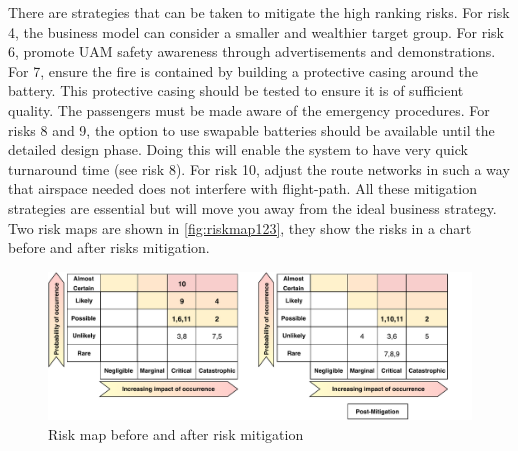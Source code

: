 There are strategies that can be taken to mitigate the high ranking risks. For risk 4, the business model can consider a smaller and wealthier target group. For risk 6, promote UAM safety awareness through advertisements and demonstrations. For 7, ensure the fire is contained by building a protective casing around the battery. This protective casing should be tested to ensure it is of sufficient quality. The passengers must be made aware of the emergency procedures. For risks 8 and 9, the option to use swapable batteries should be available until the detailed design phase. Doing this will enable the system to have very quick turnaround time (see risk 8). For risk 10, adjust the route networks in such a way that airspace needed does not interfere with flight-path. All these mitigation strategies are essential but will move you away from the ideal business strategy. Two risk maps are shown in \autoref{fig:riskmap123}, they show the risks in a chart before and after risks mitigation. 

\begin{figure}[H]
    \centering
    \includegraphics[width = \linewidth]{Figures/riskmap.pdf}    
    \caption{Risk map before and after risk mitigation}
    \label{fig:riskmap123}
\end{figure}


